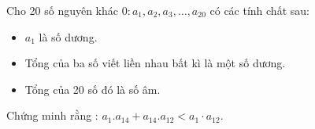 \begin{bt}
	Cho 20 số nguyên khác $0: a_1, a_2, a_3, \ldots, a_{20} $ có các tính chất sau: 
	\begin{itemize}[*]
		\item $a_1$ là số dương.
		\item Tổng của ba số viết liền nhau bất kì là một số dương.
		\item Tổng của 20 số đó là số âm.
	\end{itemize}
	Chứng minh rằng : $a_{1} . a_{14}+ a_{14} . a_{12}<a_1 \cdot a_{12}$.
	\loigiai{}
\end{bt}
